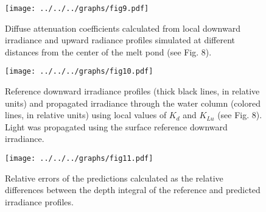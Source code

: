 \documentclass[12pt,a4paper]{scrartcl}
\newcommand{\ked}{\ensuremath{K_{d}}}
\newcommand{\klu}{\ensuremath{K_{Lu}}}
\begin{document}
\clearpage
\newpage

\begin{figure}[ht]
	\centering
	\texttt{[image: ../../../graphs/fig9.pdf]}
	\caption{Diffuse attenuation coefficients calculated from local downward irradiance and upward radiance profiles simulated at different distances from the center of the melt pond (see Fig. 8).}
\end{figure}

\clearpage
\newpage

\begin{figure}[ht]
	\centering
	\texttt{[image: ../../../graphs/fig10.pdf]}
	\caption{Reference downward irradiance profiles (thick black lines, in relative units) and propagated irradiance through the water column (colored lines, in relative units) using local values of \ked{} and \klu{} (see Fig. 8). Light was propagated using the surface reference downward irradiance.}
\end{figure}

\clearpage
\newpage

\begin{figure}[ht]
	\centering
	\texttt{[image: ../../../graphs/fig11.pdf]}
	\caption{Relative errors of the predictions calculated as the relative differences between the depth integral of the reference and predicted irradiance profiles.}
\end{figure}
\end{document}
